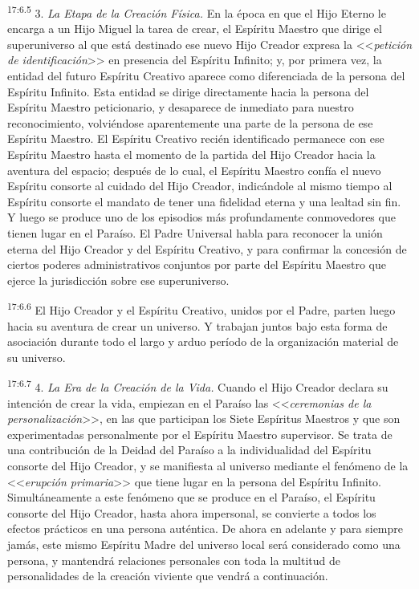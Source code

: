 \par
\textsuperscript{17:6.5} 3. \textit{La Etapa de la Creación Física.} En la época en que el Hijo Eterno le encarga a un Hijo Miguel la tarea de crear, el Espíritu Maestro que dirige el superuniverso al que está destinado ese nuevo Hijo Creador expresa la <<\textit{petición de identificación}>> en presencia del Espíritu Infinito; y, por primera vez, la entidad del futuro Espíritu Creativo aparece como diferenciada de la persona del Espíritu Infinito. Esta entidad se dirige directamente hacia la persona del Espíritu Maestro peticionario, y desaparece de inmediato para nuestro reconocimiento, volviéndose aparentemente una parte de la persona de ese Espíritu Maestro. El Espíritu Creativo recién identificado permanece con ese Espíritu Maestro hasta el momento de la partida del Hijo Creador hacia la aventura del espacio; después de lo cual, el Espíritu Maestro confía el nuevo Espíritu consorte al cuidado del Hijo Creador, indicándole al mismo tiempo al Espíritu consorte el mandato de tener una fidelidad eterna y una lealtad sin fin. Y luego se produce uno de los episodios más profundamente conmovedores que tienen lugar en el Paraíso. El Padre Universal habla para reconocer la unión eterna del Hijo Creador y del Espíritu Creativo, y para confirmar la concesión de ciertos poderes administrativos conjuntos por parte del Espíritu Maestro que ejerce la jurisdicción sobre ese superuniverso.

\par
\textsuperscript{17:6.6} El Hijo Creador y el Espíritu Creativo, unidos por el Padre, parten luego hacia su aventura de crear un universo. Y trabajan juntos bajo esta forma de asociación durante todo el largo y arduo período de la organización material de su universo.

\par
\textsuperscript{17:6.7} 4. \textit{La Era de la Creación de la Vida.} Cuando el Hijo Creador declara su intención de crear la vida, empiezan en el Paraíso las <<\textit{ceremonias de la personalización}>>, en las que participan los Siete Espíritus Maestros y que son experimentadas personalmente por el Espíritu Maestro supervisor. Se trata de una contribución de la Deidad del Paraíso a la individualidad del Espíritu consorte del Hijo Creador, y se manifiesta al universo mediante el fenómeno de la <<\textit{erupción primaria}>> que tiene lugar en la persona del Espíritu Infinito. Simultáneamente a este fenómeno que se produce en el Paraíso, el Espíritu consorte del Hijo Creador, hasta ahora impersonal, se convierte a todos los efectos prácticos en una persona auténtica. De ahora en adelante y para siempre jamás, este mismo Espíritu Madre del universo local será considerado como una persona, y mantendrá relaciones personales con toda la multitud de personalidades de la creación viviente que vendrá a continuación.

